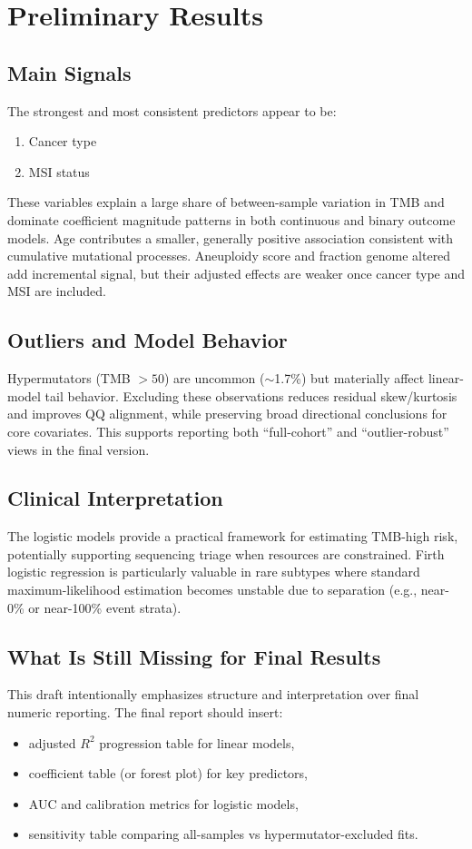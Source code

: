 \documentclass[11pt]{article}
\begin{document}
\section{Preliminary Results}

\subsection{Main Signals}
The strongest and most consistent predictors appear to be:
\begin{enumerate}
    \item Cancer type
    \item MSI status
\end{enumerate}
These variables explain a large share of between-sample variation in TMB and dominate coefficient magnitude patterns in both continuous and binary outcome models. Age contributes a smaller, generally positive association consistent with cumulative mutational processes. Aneuploidy score and fraction genome altered add incremental signal, but their adjusted effects are weaker once cancer type and MSI are included.

\subsection{Outliers and Model Behavior}
Hypermutators (TMB $>50$) are uncommon ($\sim$1.7\%) but materially affect linear-model tail behavior. Excluding these observations reduces residual skew/kurtosis and improves QQ alignment, while preserving broad directional conclusions for core covariates. This supports reporting both ``full-cohort'' and ``outlier-robust'' views in the final version.

\subsection{Clinical Interpretation}
The logistic models provide a practical framework for estimating TMB-high risk, potentially supporting sequencing triage when resources are constrained. Firth logistic regression is particularly valuable in rare subtypes where standard maximum-likelihood estimation becomes unstable due to separation (e.g., near-0\% or near-100\% event strata).

\subsection{What Is Still Missing for Final Results}
This draft intentionally emphasizes structure and interpretation over final numeric reporting. The final report should insert:
\begin{itemize}
    \item adjusted $R^2$ progression table for linear models,
    \item coefficient table (or forest plot) for key predictors,
    \item AUC and calibration metrics for logistic models,
    \item sensitivity table comparing all-samples vs hypermutator-excluded fits.
\end{itemize}
\end{document}
